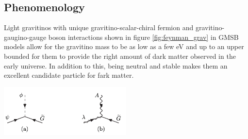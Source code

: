 {\subsection{Phenomenology}
Light gravitinos with unique gravitino-scalar-chiral fermion and gravitino-gaugino-gauge boson interactions shown in figure \ref{fig:feynman_grav} in GMSB models allow for the gravitino mass to be as low as a few eV and up to an upper bounded for them to
provide the right amount of dark matter observed in the early universe. In addition to this, being neutral and stable makes them an excellent candidate particle for fark matter.
\begin{center}
\centering
\mbox{\includegraphics[height=0.3\textwidth, width=0.5\textwidth]{THESISPLOTS/Gravitino-GauginoCoupling.png}} 
\label{fig:feynman_grav}
\end{center}
}
